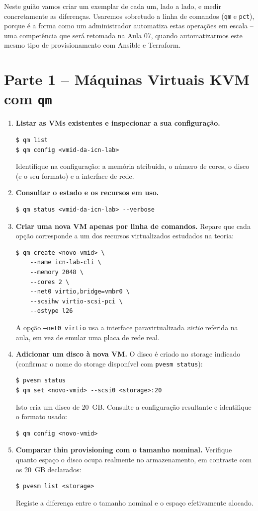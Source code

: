 \documentclass[11pt,a4paper]{article}
\begin{document}
Neste guião vamos criar um exemplar de cada um, lado a lado, e medir concretamente as diferenças. Usaremos sobretudo a linha de comandos (\texttt{qm} e \texttt{pct}), porque é a forma como um administrador automatiza estas operações em escala -- uma competência que será retomada na Aula 07, quando automatizarmos este mesmo tipo de provisionamento com Ansible e Terraform.

\section{Parte 1 -- Máquinas Virtuais KVM com \texttt{qm}}
\begin{enumerate}[label=\arabic*.]

  \item \textbf{Listar as VMs existentes e inspecionar a sua configuração.}
\begin{lstlisting}
$ qm list
$ qm config <vmid-da-icn-lab>
\end{lstlisting}
  Identifique na configuração: a memória atribuída, o número de cores, o disco (e o seu formato) e a interface de rede.

  \item \textbf{Consultar o estado e os recursos em uso.}
\begin{lstlisting}
$ qm status <vmid-da-icn-lab> --verbose
\end{lstlisting}

  \item \textbf{Criar uma nova VM apenas por linha de comandos.} Repare que cada opção corresponde a um dos recursos virtualizados estudados na teoria:
\begin{lstlisting}
$ qm create <novo-vmid> \
    --name icn-lab-cli \
    --memory 2048 \
    --cores 2 \
    --net0 virtio,bridge=vmbr0 \
    --scsihw virtio-scsi-pci \
    --ostype l26
\end{lstlisting}
  A opção \texttt{--net0 virtio} usa a interface paravirtualizada \emph{virtio} referida na aula, em vez de emular uma placa de rede real.

  \item \textbf{Adicionar um disco à nova VM.} O disco é criado no storage indicado (confirmar o nome do storage disponível com \texttt{pvesm status}):
\begin{lstlisting}
$ pvesm status
$ qm set <novo-vmid> --scsi0 <storage>:20
\end{lstlisting}
  Isto cria um disco de 20~GB. Consulte a configuração resultante e identifique o formato usado:
\begin{lstlisting}
$ qm config <novo-vmid>
\end{lstlisting}

  \item \textbf{Comparar thin provisioning com o tamanho nominal.} Verifique quanto espaço o disco ocupa realmente no armazenamento, em contraste com os 20~GB declarados:
\begin{lstlisting}
$ pvesm list <storage>
\end{lstlisting}
  Registe a diferença entre o tamanho nominal e o espaço efetivamente alocado.

\end{enumerate}
\end{document}
